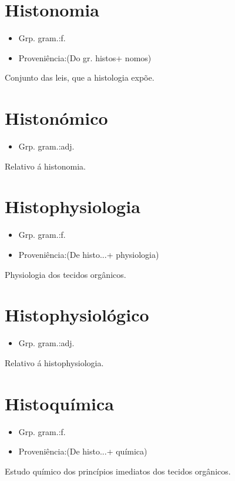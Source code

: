 \documentclass{article}
\begin{document}
\section{Histonomia}
\begin{itemize}
\item {Grp. gram.:f.}
\end{itemize}
\begin{itemize}
\item {Proveniência:(Do gr. \textunderscore histos\textunderscore  + \textunderscore nomos\textunderscore )}
\end{itemize}
Conjunto das leis, que a histologia expõe.
\section{Histonómico}
\begin{itemize}
\item {Grp. gram.:adj.}
\end{itemize}
Relativo á histonomia.
\section{Histophysiologia}
\begin{itemize}
\item {Grp. gram.:f.}
\end{itemize}
\begin{itemize}
\item {Proveniência:(De \textunderscore histo...\textunderscore  + \textunderscore physiologia\textunderscore )}
\end{itemize}
Physiologia dos tecidos orgânicos.
\section{Histophysiológico}
\begin{itemize}
\item {Grp. gram.:adj.}
\end{itemize}
Relativo á histophysiologia.
\section{Histoquímica}
\begin{itemize}
\item {Grp. gram.:f.}
\end{itemize}
\begin{itemize}
\item {Proveniência:(De \textunderscore histo...\textunderscore  + \textunderscore química\textunderscore )}
\end{itemize}
Estudo químico dos princípios imediatos dos tecidos orgânicos.
\end{document}
